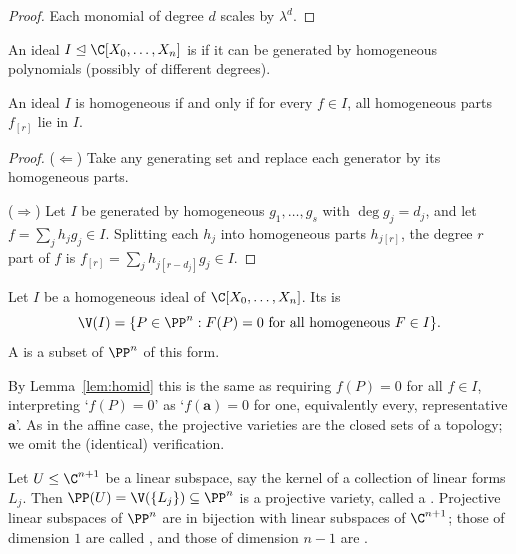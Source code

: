 \begin{proof}
	Each monomial of degree $d$ scales by $\lambda^d$.
\end{proof}

\begin{definition}
	An ideal $I \trianglelefteq \C[X_0,\dots,X_n]$ is  if it can be generated by homogeneous polynomials (possibly of different degrees).
\end{definition}

\begin{lemma}\label{lem:homid}
	An ideal $I$ is homogeneous if and only if for every $f \in I$, all homogeneous parts $f_{[r]}$ lie in $I$.
\end{lemma}

\begin{proof}
	($\Leftarrow$) Take any generating set and replace each generator by its homogeneous parts.

	($\Rightarrow$) Let $I$ be generated by homogeneous $g_1,\dots,g_s$ with $\deg g_j = d_j$, and let $f = \sum_j h_j g_j \in I$. Splitting each $h_j$ into homogeneous parts $h_{j[r]}$, the degree $r$ part of $f$ is $f_{[r]} = \sum_j h_{j[r-d_j]}g_j \in I$.
\end{proof}

\begin{definition}
	Let $I$ be a homogeneous ideal of $\C[X_0,\dots,X_n]$. Its  is
	$$\V(I) = \{P \in \PP^n : F(P) = 0 \text{ for all homogeneous } F \in I\}.$$
	A  is a subset of $\PP^n$ of this form.
\end{definition}

By Lemma~\ref{lem:homid} this is the same as requiring $f(P) = 0$ for all $f \in I$, interpreting `$f(P) = 0$' as `$f(\mathbf a) = 0$ for one, equivalently every, representative $\mathbf a$'. As in the affine case, the projective varieties are the closed sets of a topology; we omit the (identical) verification.

\begin{example}
	Let $U \leq \C^{n+1}$ be a linear subspace, say the kernel of a collection of linear forms $L_j$. Then $\PP(U) = \V(\{L_j\}) \subseteq \PP^n$ is a projective variety, called a . Projective linear subspaces of $\PP^n$ are in bijection with linear subspaces of $\C^{n+1}$; those of dimension $1$ are called , and those of dimension $n-1$ are .
\end{example}


